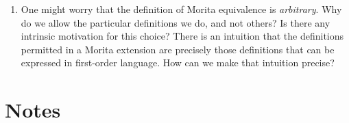 \begin{enumerate}
\item One might worry that the definition of Morita equivalence is
  {\it arbitrary}.  Why do we allow the particular definitions we do,
  and not others?  Is there any intrinsic motivation for this choice?
  There is an intuition that the definitions permitted in a Morita
  extension are precisely those definitions that can be expressed in
  first-order language.  How can we make that intuition precise?

\end{enumerate}



\section{Notes}


